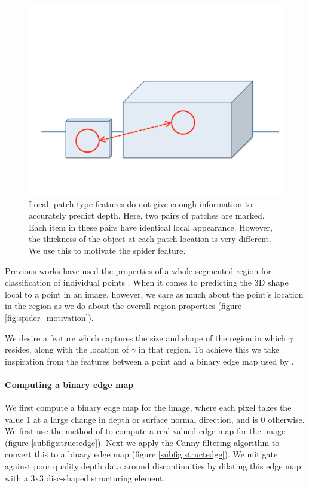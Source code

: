 \documentclass[10pt,twocolumn,letterpaper]{article}
\newcommand{\pixelidx}{\gamma}
\newcommand{\todo}[1]{\textcolor{red}{TODO: #1}}
\begin{document}
\begin{figure}[h]
  \centering 
  \includegraphics[width=0.9\columnwidth]{features_1}
  \caption{Local, patch-type features do not give enough information to accurately predict depth. Here, two pairs of patches are marked. Each item in these pairs have identical local appearance. However, the thickness of the object at each patch location is very different. We use this to motivate the spider feature.}
  \label{fig:patch_problems}
\end{figure}


Previous works have used the properties of a whole segmented region for classification of individual points \cite{golovinskiy-iccv-2009}.
When it comes to predicting the 3D shape local to a point in an image, however, we care as much about the point's location in the region as we do about the overall region properties (figure \ref{fig:spider_motivation}).

We desire a feature which captures the size and shape of the region in which $\pixelidx$ resides, along with the location of $\pixelidx$ in that region.
To achieve this we take inspiration from the features between a point and a binary edge map used by \cite{drost-3dimpvt-2012}.

\paragraph{Computing a binary edge map}
We first compute a binary edge map for the image, where each pixel takes the value 1 at a large change in depth or surface normal direction, and is 0 otherwise.
We first use the method of \cite{dollar-iccv-2013} to compute a real-valued edge map for the image (figure \ref{subfig:structedge}).
Next we apply the Canny filtering algorithm \cite{} to convert this to a binary edge map (figure \ref{subfig:structedge}).
We mitigate against poor quality depth data around discontinuities by dilating this edge map with a 3x3 disc-shaped structuring element.
\end{document}
